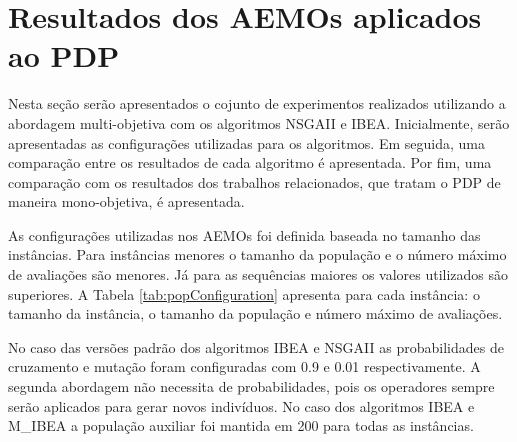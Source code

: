 \section{Resultados dos AEMOs aplicados ao PDP}

Nesta seção serão apresentados o cojunto de experimentos realizados utilizando a abordagem multi-objetiva com os algoritmos NSGAII e IBEA. Inicialmente, serão apresentadas as configurações utilizadas para os algoritmos. Em seguida, uma comparação entre os resultados de cada algoritmo é apresentada. Por fim, uma comparação com os resultados dos trabalhos relacionados, que tratam o PDP de maneira mono-objetiva, é apresentada.

As configurações utilizadas nos AEMOs foi definida baseada no tamanho das instâncias. Para instâncias menores o tamanho da população e o número máximo de avaliações são menores. Já para as sequências maiores os valores utilizados são superiores. A Tabela \ref{tab:popConfiguration} apresenta para cada instância: o tamanho da instância, o tamanho da população e número máximo de avaliações.

No caso das versões padrão dos algoritmos IBEA e NSGAII as probabilidades de cruzamento e mutação foram configuradas com 0.9 e 0.01 respectivamente. A segunda abordagem não necessita de probabilidades, pois os operadores sempre serão aplicados para gerar novos indivíduos. No caso dos algoritmos IBEA e M\_IBEA a população auxiliar foi mantida em 200 para todas as instâncias.

